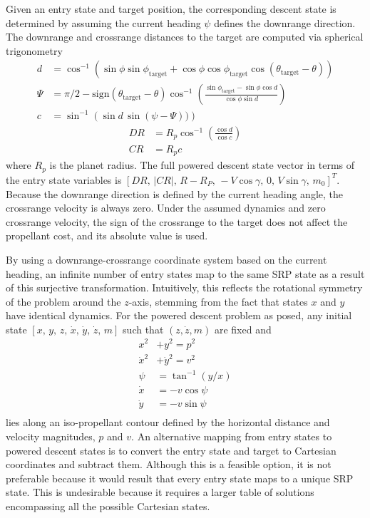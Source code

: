 Given an entry state and target position, the corresponding descent state is determined by assuming the current heading $\psi$ defines the downrange direction. The downrange and crossrange distances to the target are computed via spherical trigonometry \cite{joel_dissertation}
\begin{align}
d &= \cos^{-1}\left(\sin\phi\sin\phi_{\mathrm{target}} +\cos\phi\cos\phi_{\mathrm{target}}\cos(\theta_{\mathrm{target}}-\theta)        \right) \\
\Psi &= \pi/2 - \mathrm{sign}(\theta_{\mathrm{target}}-\theta) \cos^{-1}\left(\frac{\sin\phi_{\mathrm{target}}-\sin\phi\cos d}{\cos\phi\sin d}  \right) \\
c &= \sin^{-1}\left(\sin d\,\sin(\psi-\Psi))\right)
\end{align}
\begin{align}
DR &= R_p\cos^{-1}\left(\frac{\cos d}{\cos c}\right)\\
CR &= R_pc
\end{align}
where $R_p$ is the planet radius. 
The full powered descent state vector in terms of the entry state variables is $[DR,\, |CR|,\, R-R_P,\, -V\cos\gamma,\, 0,\, V\sin\gamma,\, m_0]^T$. Because the downrange direction is defined by the current heading angle, the crossrange velocity is always zero. Under the assumed dynamics and zero crossrange velocity, the sign of the crossrange to the target does not affect the propellant cost, and its absolute value is used.

By using a downrange-crossrange coordinate system based on the current heading, an infinite number of entry states map to the same SRP state as a result of this surjective transformation. Intuitively, this reflects the rotational symmetry of the problem around the $z$-axis, stemming from the fact that states $ x $ and $ y $ have identical dynamics. For the powered descent problem as posed, any initial state $[ x,\, y,\, z,\, \dot{x},\, \dot{y},\, \dot{z},\, m]$ such that $(z, \dot{z}, m)$ are fixed and 
\begin{align}
x^2 &+ y^2 = p^2 \\
\dot{x}^2 &+ \dot{y}^2 = v^2 \\
\psi &= \tan^{-1}(y/x) \\
\dot{x} &= -v\cos\psi \\
\dot{y} &= -v\sin\psi \\
\end{align}
lies along an iso-propellant contour defined by the horizontal distance and velocity magnitudes, $p$ and $v$. An alternative mapping from entry states to powered descent states is to convert the entry state and target to Cartesian coordinates and subtract them. Although this is a feasible option, it is not preferable because it would result that every entry state maps to a unique SRP state. This is undesirable because it requires a larger table of solutions encompassing all the possible Cartesian states.

